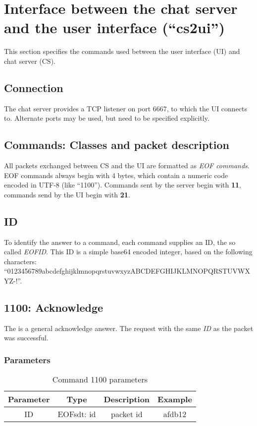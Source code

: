 \section{Interface between the chat server and the user interface ("`cs2ui"')}
\label{eofi2ui}
This section specifies the commands used between the user interface (UI)
and chat server (CS).
\subsection{Connection}
The chat server provides a TCP listener on port 6667, to which the UI connects 
to. Alternate ports may be used, but need to be specified explicitly.
\subsection{Commands: Classes and packet description}
All packets exchanged between CS and the UI are formatted as
\textit{EOF commands}. EOF commands always begin with 4 bytes, 
which contain a numeric code encoded in UTF-8 (like "`1100"').
Commands sent by the server begin with \textbf{11}, commands send by the
UI begin with \textbf{21}.
\subsection{ID}
To identify the answer to a command, each command supplies an ID, the so called
\textit{EOFID}. This ID is a simple base64 encoded integer, based on the
following characters: 
"`0123456789abcdefghijklmnopqrstuvwxyzABCDEFGHIJKLMNOPQRSTUVWXYZ-!"'.
\subsection{1100: Acknowledge}
The is a general acknowledge answer. 
The request with the same \emph{ID} as the packet was successful.
\subsubsection{Parameters}
\begin{longtable}{|c|c|c|c|}
\caption{Command 1100 parameters}\\
\hline
\textbf{Parameter} & \textbf{Type} & \textbf{Description} & \textbf{Example}\\
\hline
ID & EOFsdt: id & packet id & afdb12\\
\hline
\end{longtable}
